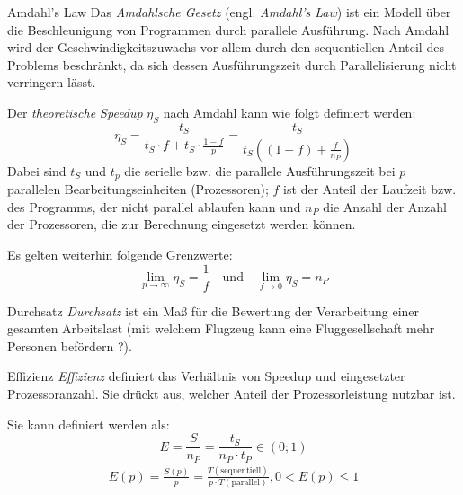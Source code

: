 \begin{defi}{Amdahl's Law}
    Das \emph{Amdahlsche Gesetz} (engl. \emph{Amdahl's Law}) ist ein Modell über die Beschleunigung von Programmen durch parallele Ausführung.
    Nach Amdahl wird der Geschwindigkeitszuwachs vor allem durch den sequentiellen Anteil des Problems beschränkt, da sich dessen Ausführungszeit durch Parallelisierung nicht verringern lässt.
    
    Der \emph{theoretische Speedup} $\eta_S$ nach Amdahl kann wie folgt definiert werden:
    \[
        \eta_S = \frac{t_S}{t_S \cdot f + t_S \cdot \frac{1-f}{p} } = \frac{t_S}{t_S \left((1 - f) + \frac{f}{n_P}\right)}
    \]
    Dabei sind $t_S$ und $t_p$ die serielle bzw. die parallele Ausführungszeit bei $p$ parallelen Bearbeitungseinheiten (Prozessoren);
    $f$ ist der Anteil der Laufzeit bzw. des Programms, der nicht parallel ablaufen kann und $n_P$ die Anzahl der Anzahl der Prozessoren, die zur Berechnung eingesetzt werden können.
    
    Es gelten weiterhin folgende Grenzwerte:
    \[
        \lim_{p \to \infty} \eta_S = \frac{1}{f} \quad \text{und} \quad \lim_{f \to 0 } \eta_S = n_P
    \]
\end{defi}

\begin{bonus}{Durchsatz}
    \emph{Durchsatz} ist ein Maß für die Bewertung der Verarbeitung einer gesamten Arbeitslast
    (mit welchem Flugzeug kann eine Fluggesellschaft mehr Personen befördern ?).
\end{bonus}

\begin{defi}{Effizienz}
    \emph{Effizienz} definiert das Verhältnis von Speedup und eingesetzter Prozessoranzahl.
    Sie drückt aus, welcher Anteil der Prozessorleistung nutzbar ist.
    
    Sie kann definiert werden als:
    \[
        E = \frac{S}{n_P} = \frac{t_S}{n_P\cdot t_P} \in (0; 1)
    \]
    \begin{align*}
        E(p) = \frac{S(p)}{p} =
        \frac{T(\text{sequentiell})}{p\cdot T(\text{parallel})},
        0<E(p)\leq 1
    \end{align*}
\end{defi}

